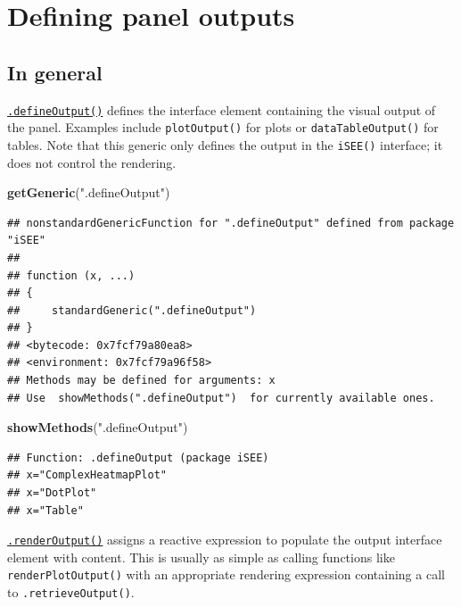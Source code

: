 \documentclass[
]{book}
\newenvironment{Shaded}{\begin{snugshade}}{\end{snugshade}}
\newcommand{\KeywordTok}[1]{\textcolor[rgb]{0.13,0.29,0.53}{\textbf{#1}}}
\newcommand{\NormalTok}[1]{#1}
\newcommand{\StringTok}[1]{\textcolor[rgb]{0.31,0.60,0.02}{#1}}
\begin{document}
\hypertarget{defining-panel-outputs}{%
\section{Defining panel outputs}\label{defining-panel-outputs}}

\hypertarget{in-general-1}{%
\subsection{In general}\label{in-general-1}}

\href{https://isee.github.io/iSEE/reference/output-generics.html}{\texttt{.defineOutput()}} defines the interface element containing the visual output of the panel.
Examples include \texttt{plotOutput()} for plots or \texttt{dataTableOutput()} for tables.
Note that this generic only defines the output in the \texttt{iSEE()} interface; it does not control the rendering.

\begin{Shaded}
\begin{Highlighting}[]
\KeywordTok{getGeneric}\NormalTok{(}\StringTok{".defineOutput"}\NormalTok{)}
\end{Highlighting}
\end{Shaded}

\begin{verbatim}
## nonstandardGenericFunction for ".defineOutput" defined from package "iSEE"
## 
## function (x, ...) 
## {
##     standardGeneric(".defineOutput")
## }
## <bytecode: 0x7fcf79a80ea8>
## <environment: 0x7fcf79a96f58>
## Methods may be defined for arguments: x
## Use  showMethods(".defineOutput")  for currently available ones.
\end{verbatim}

\begin{Shaded}
\begin{Highlighting}[]
\KeywordTok{showMethods}\NormalTok{(}\StringTok{".defineOutput"}\NormalTok{)}
\end{Highlighting}
\end{Shaded}

\begin{verbatim}
## Function: .defineOutput (package iSEE)
## x="ComplexHeatmapPlot"
## x="DotPlot"
## x="Table"
\end{verbatim}

\href{https://isee.github.io/iSEE/reference/output-generics.html}{\texttt{.renderOutput()}} assigns a reactive expression to populate the output interface element with content.
This is usually as simple as calling functions like \texttt{renderPlotOutput()} with an appropriate rendering expression containing a call to \texttt{.retrieveOutput()}.
\end{document}
